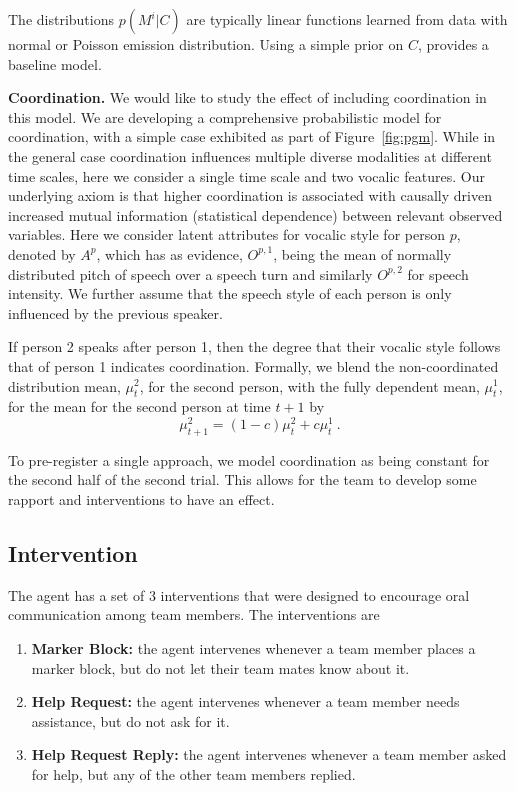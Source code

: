 %
    The distributions $p(M^i|C)$ are typically linear functions learned from data
    with normal or Poisson emission distribution. Using a simple prior on $C$,
    provides a baseline model.

    \textbf{Coordination.}
    We would like to study the effect of including coordination in this model.
    We are developing a comprehensive probabilistic model for coordination, with
    a simple case exhibited as part of Figure~\ref{fig:pgm}.  While in the
    general case coordination influences multiple diverse modalities at
    different time scales, here we consider a single time scale and two vocalic
    features.  Our underlying axiom is that higher coordination is associated
    with causally driven increased mutual information (statistical dependence)
    between relevant observed variables. Here we consider latent attributes for
    vocalic style for person $p$, denoted by $A^{p}$, which has as evidence,
    $O^{p,1}$, being the mean of normally distributed pitch of speech over a
    speech turn and similarly $O^{p,2}$ for speech intensity.  We further assume
    that the speech style of each person is only influenced by the previous
    speaker.

    If person 2 speaks after
    person 1, then the degree that their vocalic style follows that of person 1
    indicates coordination. Formally, we blend the non-coordinated distribution
    mean, $\mu^2_t$, for the second person, with the fully dependent mean,
    $\mu^1_t$, for the mean for the second person at time $t+1$ by
    \begin{equation}
    \mu^2_{t+1} = (1-c) \mu^2_t + c\mu^1_t ~.
    \end{equation}

    To pre-register a single approach, we model coordination as being
    constant for the second half of the second
    trial. This allows for the team to develop some rapport and interventions to
    have an effect. 

\subsection{Intervention}

The agent has a set of 3 interventions that were designed to encourage oral communication among team members. The interventions are

\begin{enumerate}
	\item \textbf{Marker Block:} the agent intervenes whenever a team member places a marker block, but do not let their team mates know about it.
	\item \textbf{Help Request:} the agent intervenes whenever a team member needs assistance, but do not ask for it.
	\item \textbf{Help Request Reply:} the agent intervenes whenever a team member asked for help, but any of the other team members replied.
\end{enumerate}

